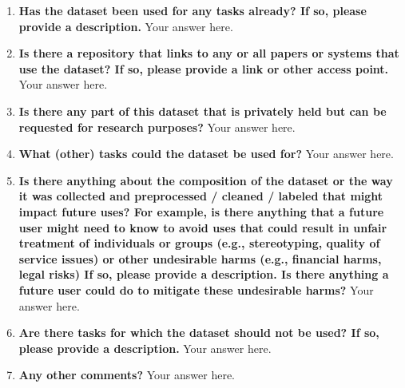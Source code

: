 \documentclass{article}
\begin{document}
    \begin{enumerate}[leftmargin=0.65cm]
        \scriptsize
        \item \textbf{Has the dataset been used for any tasks already? If so, please provide a description.}
        \newline 
        Your answer here.
        \newline 
        \item \textbf{Is there a repository that links to any or all papers or systems that use the dataset? If so, please provide a link or other access point.}
        \newline 
        Your answer here.
        \newline 
        \item \textbf{Is there any part of this dataset that is privately held but can be requested for research purposes?}
        \newline 
        Your answer here.
        \newline 
        \item \textbf{What (other) tasks could the dataset be used for?}
        \newline 
        Your answer here.
        \newline 
        \item \textbf{Is there anything about the composition of the dataset or the way it was collected and preprocessed / cleaned / labeled that might impact future uses? For example, is there anything that a future user might need to know to avoid uses that could result in unfair treatment of individuals or groups (e.g., stereotyping, quality of service issues) or other undesirable harms (e.g., financial harms, legal risks) If so, please provide a description. Is there anything a future user could do to mitigate these undesirable harms?}
        \newline 
        Your answer here.
        \newline 
        \item \textbf{Are there tasks for which the dataset should not be used? If so, please provide a description.}
        \newline 
        Your answer here.
        \newline 
        \item \textbf{Any other comments?}
        \newline 
        Your answer here.
        \newline 
    \end{enumerate}
    
\end{document}

